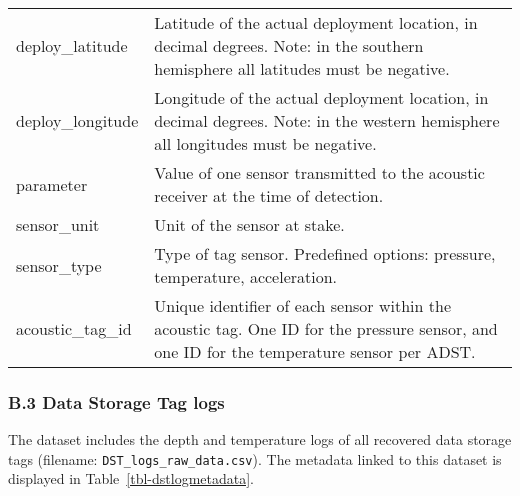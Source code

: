 \documentclass[
  authoryear,
  review,
  3p]{elsarticle}
\begin{document}
\begin{longtable}[]{@{}
  >{\raggedright\arraybackslash}p{}
  >{\raggedright\arraybackslash}p{}@{}}
deploy\_latitude & Latitude of the actual deployment location, in
decimal degrees. Note: in the southern hemisphere all latitudes must be
negative. \\
deploy\_longitude & Longitude of the actual deployment location, in
decimal degrees. Note: in the western hemisphere all longitudes must be
negative. \\
parameter & Value of one sensor transmitted to the acoustic receiver at
the time of detection. \\
sensor\_unit & Unit of the sensor at stake. \\
sensor\_type & Type of tag sensor. Predefined options: pressure,
temperature, acceleration. \\
acoustic\_tag\_id & Unique identifier of each sensor within the acoustic
tag. One ID for the pressure sensor, and one ID for the temperature
sensor per ADST. \\
\end{longtable}

\hypertarget{b.3-data-storage-tag-logs}{%
\subsubsection*{\texorpdfstring{\textbf{B.3} Data Storage Tag
logs}{B.3 Data Storage Tag logs}}\label{b.3-data-storage-tag-logs}}

The dataset includes the depth and temperature logs of all recovered
data storage tags (filename: \texttt{DST\_logs\_raw\_data.csv}). The
metadata linked to this dataset is displayed in
Table~\ref{tbl-dstlogmetadata}.
\end{document}
